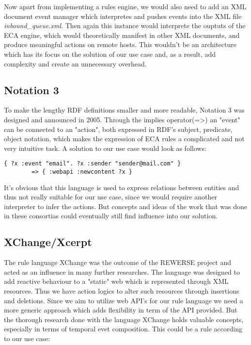 Now apart from implementing a rules engine, we would also need to add an XML document event manager which interpretes and pushes events into the XML file \emph{inbound\_queue.xml}. Then again this instance would interprete the ouptuts of the ECA engine, which would theoretically manifest in other XML documents, and produce meaningful actions on remote hosts. This wouldn't be an architecture which has its focus on the solution of our use case and, as a result, add complexity and create an unnecessary overhead.

\subsection{Notation 3}
To make the lengthy RDF definitions smaller and more readable, Notation 3\cite{wwwn3} was designed and announced in 2005. Through the implies operator(=\textgreater) an "event" can be connected to an "action", both expressed in RDF's subject, predicate, object notation, which makes the expression of ECA rules a complicated and not very intuitive task. A solution to our use case would look as follows:

\begin{lstlisting}[frame=single,float=h,label=lstn3,language=N3,caption=E-Mail Example rule expressed in Notation 3]
	{ ?x :event "email". ?x :sender "sender@mail.com" }
		=> { :webapi :newcontent ?x }
\end{lstlisting}


It's obvious that this language is used to express relations between entities and thus not really suitable for our use case, since we would require another interpreter to infer the actions. But concepts and ideas of the work that was done in these consortias could eventually still find influence into our solution.

\subsection{XChange/Xcerpt}
The rule language XChange\cite{2005-Patranjan-TLE.pdf} was the outcome of the REWERSE project and acted as an influence in many further researches. The language was designed to add reactive behaviour to a "static" web which is represented through XML resources. Thus we have action logics to alter such resources through insertions and deletions. Since we aim to utilize web API's for our rule language we need a more generic approach which adds flexibility in term of the API provided. But the thorough research done with the language XChange holds valuable concepts, especially in terms of temporal evet composition. This could be a rule according to our use case:

